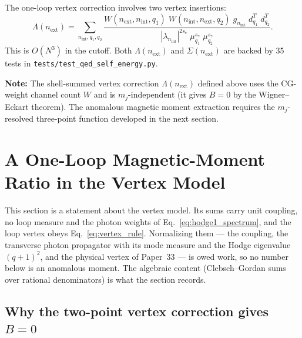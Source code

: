 \documentclass[11pt]{article}
\begin{document}
The one-loop vertex correction involves two vertex insertions:
\begin{equation}
  \Lambda(n_{\mathrm{ext}}) = \sum_{n_{\mathrm{int}}, q_1, q_2}
    \frac{W(n_{\mathrm{ext}}, n_{\mathrm{int}}, q_1) \;
          W(n_{\mathrm{int}}, n_{\mathrm{ext}}, q_2) \;
          g_{n_{\mathrm{int}}} \; d_{q_1}^T \; d_{q_2}^T}
         {|\lambda_{n_{\mathrm{int}}}|^{2s_e} \;
          \mu_{q_1}^{s_\gamma} \; \mu_{q_2}^{s_\gamma}}.
  \label{eq:vertex_correction}
\end{equation}
This is $O(N^3)$ in the cutoff.  Both $\Lambda(n_{\mathrm{ext}})$ and
$\Sigma(n_{\mathrm{ext}})$ are backed by 35 tests in
\texttt{tests/test\_qed\_self\_energy.py}.

\noindent\textbf{Note:} The shell-summed vertex correction
$\Lambda(n_{\mathrm{ext}})$ defined above uses the CG-weight channel
count $W$ and is $m_j$-independent (it gives $B = 0$ by the
Wigner--Eckart theorem).  The anomalous magnetic moment extraction
requires the $m_j$-resolved three-point function developed in the
next section.

\section{A One-Loop Magnetic-Moment Ratio in the Vertex Model}
\label{sec:anomalous_moment}

This section is a statement about the vertex model.  Its sums carry
unit coupling, no loop measure and the photon weights of
Eq.~\eqref{eq:hodge1_spectrum}, and the loop vertex obeys
Eq.~\eqref{eq:vertex_rule}.  Normalizing them --- the coupling, the
transverse photon propagator with its mode measure and the Hodge
eigenvalue $(q+1)^2$, and the physical vertex of Paper~33 --- is owed
work, so no number below is an anomalous moment.  The algebraic
content (Clebsch--Gordan sums over rational denominators) is what the
section records.

\subsection{Why the two-point vertex correction gives $B = 0$}
\end{document}
